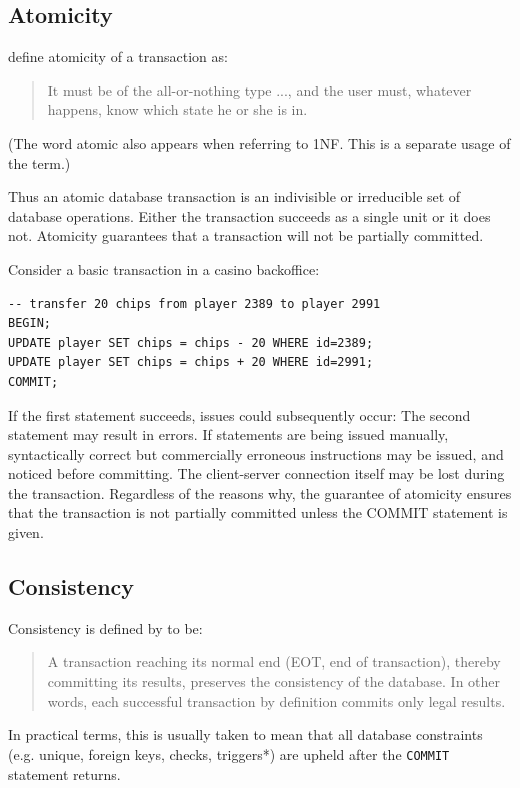 \documentclass{pgnotes}
\begin{document}
\subsection{Atomicity}
\label{sec:atomicity}

\citet{haerder:1983:principles} define atomicity of a transaction as:
\begin{quotation}
  It must be of the all-or-nothing type ..., and the user must, whatever happens, know which state he or she is in.
\end{quotation}
(The word atomic also appears when referring to 1NF. This is a separate usage of the term.)

Thus an atomic database transaction is an indivisible or irreducible set of database operations.
Either the transaction succeeds as a single unit or it does not.
Atomicity guarantees that a transaction will not be partially committed.

Consider a basic transaction in a casino backoffice: 
\begin{verbatim}
-- transfer 20 chips from player 2389 to player 2991
BEGIN; 
UPDATE player SET chips = chips - 20 WHERE id=2389;
UPDATE player SET chips = chips + 20 WHERE id=2991;
COMMIT;
\end{verbatim}
If the first statement succeeds, issues could subsequently occur:
The second statement may result in errors.
If statements are being issued manually, syntactically correct but commercially erroneous instructions may be issued, and noticed before committing.
The client-server connection itself may be lost during the transaction.
Regardless of the reasons why, the guarantee of atomicity ensures that the transaction is not partially committed unless the COMMIT statement is given.


\subsection{Consistency}
\label{sec:consistency}

Consistency is defined by \citet{haerder:1983:principles} to be:
\begin{quotation}
  A transaction reaching its normal end (EOT, end of transaction), thereby committing its results, preserves the consistency of the database.
  In other words, each successful transaction by definition commits only legal results.
\end{quotation}

In practical terms, this is usually taken to mean that all database constraints (e.g. unique, foreign keys, checks, triggers*) are upheld after the \texttt{COMMIT} statement returns.
\end{document}
